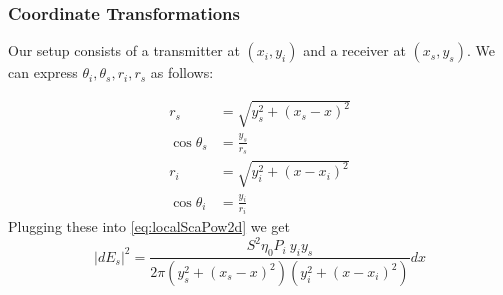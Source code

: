 \documentclass{article}
\begin{document}
\subsubsection*{Coordinate Transformations}
Our setup consists of a transmitter at $(x_i, y_i)$ and a receiver at 
$(x_s, y_s)$. We can express $\theta_i, \theta_s, r_i, r_s$ as follows:

\begin{align*}
   r_s &= \sqrt{y_s^2 + (x_s - x)^2} \\
   \cos \theta_s &= \frac{y_s}{r_s} \\
   r_i &= \sqrt{y_i^2 + (x - x_i)^2} \\
   \cos \theta_i &= \frac{y_i}{r_i}
\end{align*}
Plugging these into \eqref{eq:localScaPow2d} we get
\begin{equation}
   |dE_s|^2 = \frac{S^2 \eta_0 P_i \ y_i y_s }{2 \pi (y_s^2 + (x_s - x)^2) ( y_i^2 + (x -
   x_i)^2)} dx
   \label{eq:localScaPow2dSetupParam}
\end{equation}
\newpage
   
\end{document}

